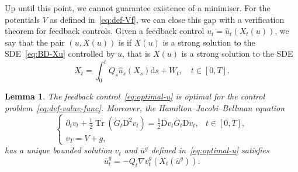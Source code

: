 \documentclass[11pt, a4paper]{scrartcl}
\numberwithin{equation}{section}
\theoremstyle{plain}
\newtheorem{lemma}[foo]{Lemma}
\theoremstyle{remark}
\newcommand{\mathD}{\mathrm{D}}
\newcommand{\mathd}{\mathrm{d}}
\newcommand{\tmop}[1]{\ensuremath{\operatorname{#1}}}
\newcommand{\tmtextit}[1]{\text{{\itshape{#1}}}}
\begin{document}
Up until this point, we cannot guarantee existence of a minimiser. For the
potentials $V$ as defined in~\eqref{eq:def-Vf}, we can close this gap with a
verification theorem for feedback controls. Given a feedback control $u_t =
	\hat{u}_t (X_t (u))$, we say that the pair $(u, X (u))$ is
\tmtextit{admissible} if $X (u)$ is a strong solution to the
SDE~\eqref{eq:BD-Xu} controlled by $u$, that is $X (u)$ is a strong solution
to the SDE
\[ X_t = \int_0^t Q_s  \hat{u}_s (X_s) \mathd s + W_t, \quad t \in [0, T] . \]
\begin{lemma}
	\label{lem:verification}The feedback control~\eqref{eq:optimal-u} is optimal
	for the control problem~\eqref{eq:def-value-func}. Moreover, the Hamilton--Jacobi--Bellman equation
	\begin{equation}
		\begin{cases}
			\partial_t v_t + \frac{1}{2} \tmop{Tr} (\dot{G}_t \mathD^2 v_t) =
			\frac{1}{2} \mathD v_t \dot{G_t} \mathD v_t, & t \in [0, T], \\
			v_T = V + g,
		\end{cases}  \label{eq:HJB}
	\end{equation}
	has a unique bounded solution $v_t$ and $\bar{u}^g$ defined
	in~\eqref{eq:optimal-u} satisfies
	\begin{equation}
		\bar{u}^g_t = - Q_t \nabla v^g_t (X_t (\bar{u}^g)) . \label{eq:u-via-HJB}
	\end{equation}
\end{lemma}
\end{document}
